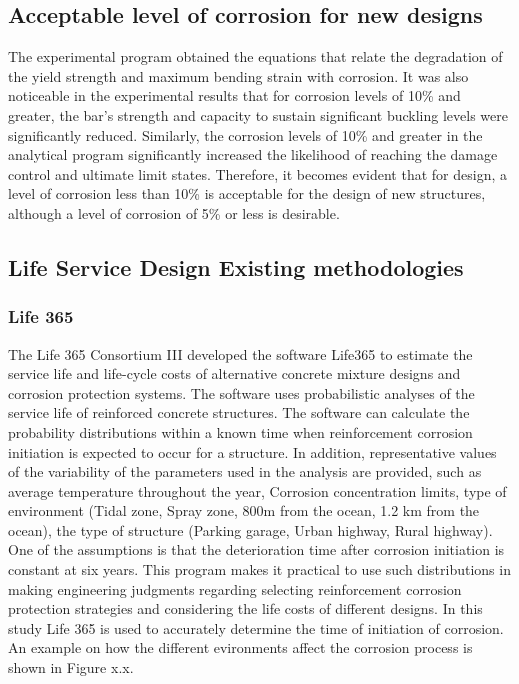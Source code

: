\subsection{Acceptable level of corrosion for new designs}
The experimental program obtained the equations that relate the degradation of the yield strength and maximum bending strain with corrosion. It was also noticeable in the experimental results that for corrosion levels of 10\% and greater, the bar's strength and capacity to sustain significant buckling levels were significantly reduced. Similarly, the corrosion levels of 10\% and greater in the analytical program significantly increased the likelihood of reaching the damage control and ultimate limit states. Therefore, it becomes evident that for design, a level of corrosion less than 10\% is acceptable for the design of new structures, although a level of corrosion of 5\% or less is desirable.

\subsection{Life Service Design Existing methodologies}

\subsubsection{Life 365}
The Life 365 Consortium III developed the software Life365 to estimate the service life and life-cycle costs of alternative concrete mixture designs and corrosion protection systems\cite{Bentz2003}. The software uses probabilistic analyses of the service life of reinforced concrete structures. The software can calculate the probability distributions within a known time when reinforcement corrosion initiation is expected to occur for a structure. In addition, representative values of the variability of the parameters used in the analysis are provided, such as average temperature throughout the year, Corrosion concentration limits, type of environment (Tidal zone, Spray zone, 800m from the ocean, 1.2 km from the ocean), the type of structure (Parking garage, Urban highway, Rural highway). One of the assumptions is that the deterioration time after corrosion initiation is constant at six years. This program makes it practical to use such distributions in making engineering judgments regarding selecting reinforcement corrosion protection strategies and considering the life costs of different designs. In this study Life 365 is used to accurately determine the time of initiation of corrosion. An example on how the different evironments affect the corrosion process is shown in Figure x.x.

